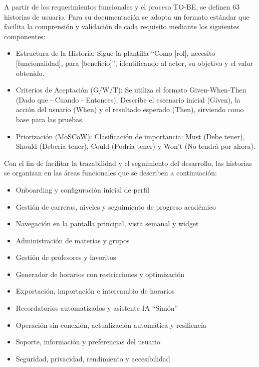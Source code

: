 A partir de los requerimientos funcionales y el proceso TO-BE, se definen 63 historias de usuario. Para su documentación se adopta un formato estándar que facilita la comprensión y validación de cada requisito mediante los siguientes componentes:

\begin{itemize}
    \item Estructura de la Historia: Sigue la plantilla ``Como [rol], necesito [funcionalidad], para [beneficio]'', identificando al actor, su objetivo y el valor obtenido.
    \item Criterios de Aceptación (G/W/T): Se utiliza el formato Given-When-Then (Dado que - Cuando - Entonces). Describe el escenario inicial (Given), la acción del usuario (When) y el resultado esperado (Then), sirviendo como base para las pruebas.
    \item Priorización (MoSCoW): Clasificación de importancia: Must (Debe tener), Should (Debería tener), Could (Podría tener) y Won't (No tendrá por ahora).
\end{itemize}

Con el fin de facilitar la trazabilidad y el seguimiento del desarrollo, las historias se organizan en las áreas funcionales que se describen a continuación:

\begin{itemize}[nosep]
  \item Onboarding y configuración inicial de perfil
  \item Gestión de carreras, niveles y seguimiento de progreso académico
  \item Navegación en la pantalla principal, vista semanal y widget
  \item Administración de materias y grupos
  \item Gestión de profesores y favoritos
  \item Generador de horarios con restricciones y optimización
  \item Exportación, importación e intercambio de horarios
  \item Recordatorios automatizados y asistente IA ``Simón''
  \item Operación sin conexión, actualización automática y resiliencia
  \item Soporte, información y preferencias del usuario
  \item Seguridad, privacidad, rendimiento y accesibilidad
\end{itemize}



